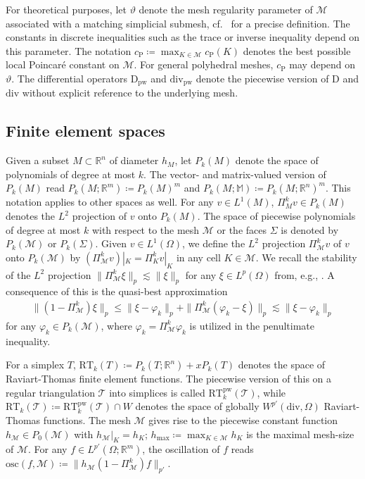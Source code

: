 \documentclass[a4paper]{amsart}
\numberwithin{equation}{section}
\newcommand{\R}{\mathbb{R}}
\renewcommand{\div}{\mathrm{div}}
\newcommand{\Tcal}{\mathcal{T}}
\newcommand{\Mcal}{\mathcal{M}}
\newcommand{\RT}{\mathrm{RT}}
\newcommand{\pw}{\mathrm{pw}}
\newcommand{\D}{\mathrm{D}}
\newcommand{\osc}{\mathrm{osc}}
\theoremstyle{remark}
\begin{document}
For theoretical purposes, let $\vartheta$ denote the mesh regularity parameter of $\Mcal$ associated with a matching simplicial submesh, cf.~\cite[Definition 1.38]{DiPietroErn2012} for a precise definition. The constants in discrete inequalities such as the trace or inverse inequality depend on this parameter.
The notation $c_\mathrm{P} \coloneqq \max_{K \in \Mcal} c_\mathrm{P}(K)$ denotes the best possible local Poincar\'e constant on $\Mcal$. For general polyhedral meshes, $c_\mathrm{P}$ may depend on $\vartheta$.
The differential operators $\D_\pw$ and $\div_\pw$ denote the piecewise version of $\D$ and $\div$ without explicit reference to the underlying mesh.

\subsection{Finite element spaces}\label{sec:fem-spaces}
Given a subset $M \subset \R^n$ of diameter $h_M$, let $P_k(M)$ denote the space of polynomials of degree at most $k$.
The vector- and matrix-valued version of $P_k(M)$ read $P_k(M;\mathbb{R}^m) \coloneqq P_k(M)^m$ and $P_k(M;\mathbb{M}) \coloneqq P_k(M;\mathbb{R}^n)^m$.
This notation applies to other spaces as well.
For any $v \in L^1(M)$, $\Pi_M^k v \in P_k(M)$ denotes the $L^2$ projection of $v$ onto $P_k(M)$. The space of piecewise polynomials of degree at most $k$ with respect to the mesh $\mathcal{M}$ or the faces $\Sigma$ is denoted by $P_k(\mathcal{M})$ or $P_k(\Sigma)$.
Given $v \in L^1(\Omega)$, we define the $L^2$ projection $\Pi_{\Mcal}^k v$ of $v$ onto $P_k(\Mcal)$ by $(\Pi_{\Mcal}^k v)|_K = \Pi_K^k v|_K$ in any cell $K \in \Mcal$.
We recall the stability of the $L^2$ projection $\|\Pi_\Mcal^k \xi\|_p \lesssim \|\xi\|_p$ for any $\xi \in L^p(\Omega)$
from, e.g., \cite[Lemma 3.2]{DiPietroDroniou2017}. A consequence of this is the quasi-best approximation
\begin{align}\label{ineq:quasi-opt-L2}
	\|(1 - \Pi_{\Mcal}^k) \xi\|_p \leq \|\xi - \varphi_k\|_p + \|\Pi_{\Mcal}^k(\varphi_k - \xi)\|_p \lesssim \|\xi - \varphi_k\|_p
\end{align}
for any $\varphi_{k} \in P_k(\Mcal)$, where $\varphi_{k} = \Pi_\Mcal^k \varphi_k$ is utilized in the penultimate inequality.

For a simplex $T$, $\RT_k(T) \coloneqq P_k(T;\R^n) + xP_k(T)$ denotes the space of Raviart-Thomas finite element functions. The piecewise version of this on a regular triangulation $\Tcal$ into simplices is called $\RT^\pw_k(\Tcal)$, while $\RT_k(\Tcal) \coloneqq \RT_k^\pw(\Tcal) \cap W$ denotes the space of globally $W^{p'}(\div,\Omega)$ Raviart-Thomas functions.
The mesh $\Mcal$ gives rise to the piecewise constant function $h_\Mcal \in P_0(\Mcal)$ with $h_\Mcal|_K = h_K$; $h_{\max} \coloneqq \max_{K \in \Mcal} h_K$ is the maximal mesh-size of $\Mcal$.
For any $f \in L^{p'}(\Omega;\R^m)$, the oscillation of $f$ reads $\osc(f,\Mcal) \coloneqq \|h_\Mcal(1 - \Pi_\Mcal^k) f\|_{p'}$.
\end{document}

